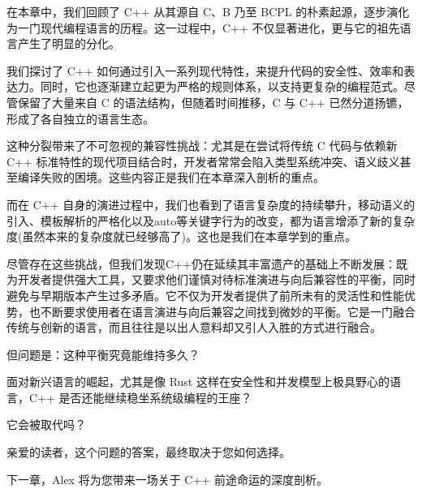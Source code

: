 在本章中，我们回顾了 C++ 从其源自 C、B 乃至 BCPL 的朴素起源，逐步演化为一门现代编程语言的历程。这一过程中，C++ 不仅显著进化，更与它的祖先语言产生了明显的分化。

我们探讨了 C++ 如何通过引入一系列现代特性，来提升代码的安全性、效率和表达力。同时，它也逐渐建立起更为严格的规则体系，以支持更复杂的编程范式。尽管保留了大量来自 C 的语法结构，但随着时间推移，C 与 C++ 已然分道扬镳，形成了各自独立的语言生态。

这种分裂带来了不可忽视的兼容性挑战：尤其是在尝试将传统 C 代码与依赖新 C++ 标准特性的现代项目结合时，开发者常常会陷入类型系统冲突、语义歧义甚至编译失败的困境。这些内容正是我们在本章深入剖析的重点。

而在 C++ 自身的演进过程中，我们也看到了语言复杂度的持续攀升，移动语义的引入、模板解析的严格化以及auto等关键字行为的改变，都为语言增添了新的复杂度(虽然本来的复杂度就已经够高了)。这也是我们在本章学到的重点。

尽管存在这些挑战，但我们发现C++仍在延续其丰富遗产的基础上不断发展：既为开发者提供强大工具，又要求他们谨慎对待标准演进与向后兼容性的平衡，同时避免与早期版本产生过多矛盾。它不仅为开发者提供了前所未有的灵活性和性能优势，也不断要求使用者在语言演进与向后兼容之间找到微妙的平衡。它是一门融合传统与创新的语言，而且往往是以出人意料却又引人入胜的方式进行融合。

但问题是：这种平衡究竟能维持多久？

面对新兴语言的崛起，尤其是像 Rust 这样在安全性和并发模型上极具野心的语言，C++ 是否还能继续稳坐系统级编程的王座？

它会被取代吗？

亲爱的读者，这个问题的答案，最终取决于您如何选择。

下一章，Alex 将为您带来一场关于 C++ 前途命运的深度剖析。